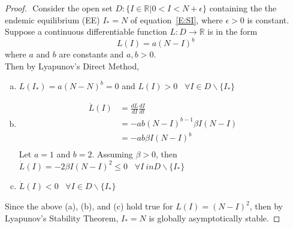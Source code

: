     \begin{proof}
      $ $\newline	
      Consider the open set $D: \{I \in \mathbb{R}| 0 < I < N+ \epsilon \}$ containing the the endemic equilibrium (EE) $I_* = N$ of equation~\eqref{E:SI}, where $\epsilon > 0$ is constant. 
      Suppose a continuous differentiable function $L:D\rightarrow \mathbb{R}$  is in the form
      \begin{equation}
      L(I) = a(N-I)^b
      \end{equation} where $a$ and $b$ are constants and $a, b > 0$.\\
      
      Then by Lyapunov's Direct Method,

      \begin{enumerate}[(a)]
      	\item $L(I_*) = a(N-N)^b = 0$ and $L(I)>0$ \, $\forall I\in D\backslash \{I_*\}$
      	\item
        \begin{align*}
            \dot{L}(I)  &= \frac{dL}{dI} \frac{dI}{dt} \\
      					&= -ab(N-I)^{b-1}\beta I(N-I)\\
      					&= -ab\beta I(N-I)^b\\
      	\end{align*}
      	Let $a = 1$ and $b = 2$. Assuming $\beta>0$, then\\
      	$\dot{L}(I) = -2\beta I(N-I)^2 \leq 0$ \, $\forall I\ in D \backslash \{I_*\}$
      	\item $\dot{L}(I) < 0$ \, $\forall I\in D\backslash \{I_*\}$
      \end{enumerate}
      
  	  Since the above (a), (b), and (c) hold true for $L(I) = (N-I)^2$, then by Lyapunov's Stability Theorem, $I_* = N$ is globally asymptotically stable. 
    \end{proof}
